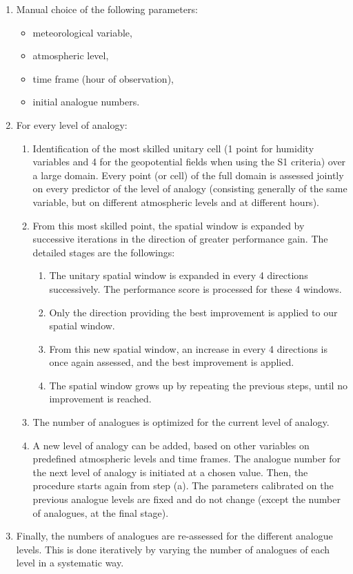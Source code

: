 \documentclass{ametsoc}
\begin{document}
\begin{enumerate}
	\item Manual choice of the following parameters:
	\begin{itemize}
		\item meteorological variable,
		\item atmospheric level,
		\item time frame (hour of observation),
		\item initial analogue numbers.
	\end{itemize}
	
	\item For every level of analogy:
	\begin{enumerate}
		\item Identification of the most skilled unitary cell (1 point for humidity variables and 4 for the geopotential fields when using the S1 criteria) over a large domain. Every point (or cell) of the full domain is assessed jointly on every predictor of the level of analogy (consisting generally of the same variable, but on different atmospheric levels and at different hours).
		\item From this most skilled point, the spatial window is expanded by successive iterations in the direction of greater performance gain. The detailed stages are the followings:
		\begin{enumerate}
			\item The unitary spatial window is expanded in every 4 directions successively. The performance score is processed for these 4 windows.
			\item Only the direction providing the best improvement is applied to our spatial window.
			\item From this new spatial window, an increase in every 4 directions is once again assessed, and the best improvement is applied.
			\item The spatial window grows up by repeating the previous steps, until no improvement is reached.
		\end{enumerate}
		\item The number of analogues is optimized for the current level of analogy.
		\item A new level of analogy can be added, based on other variables on predefined atmospheric levels and time frames. The analogue number for the next level of analogy is initiated at a chosen value. Then, the procedure starts again from step (a). The parameters calibrated on the previous analogue levels are fixed and do not change (except the number of analogues, at the final stage). 
	\end{enumerate}
	\item Finally, the numbers of analogues are re-assessed for the different analogue levels. This is done iteratively by varying the number of analogues of each level in a systematic way.
\end{enumerate}
\end{document}
